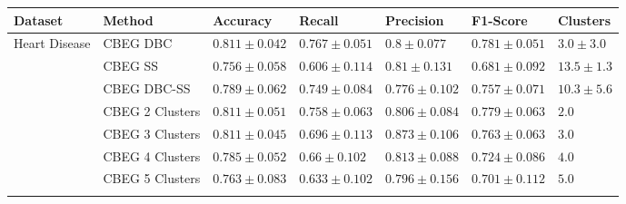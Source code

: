 \documentclass[12pt,a4paper]{standalone}
\begin{document}
\begin{tabular}{lllllll}
    \toprule
    \textbf{Dataset}                & \textbf{Method}   & \textbf{Accuracy}                             & \textbf{Recall}                               & \textbf{Precision}                            & \textbf{F1-Score}                             & \textbf{Clusters} \\ \midrule
    \multirow{11}{*}{Heart Disease} & CBEG DBC          & \cellcolor{gray!50}$0.811 \pm 0.042$          & \cellcolor{gray!50}$\mathbf{0.767 \pm 0.051}$ & $0.8 \pm 0.077$                               & \cellcolor{gray!50}$0.781 \pm 0.051$          & $3.0 \pm 3.0$ \\ \nopagebreak
                                    & CBEG SS           & $0.756 \pm 0.058$                             & $0.606 \pm 0.114$                             & $0.81 \pm 0.131$                              & $0.681 \pm 0.092$                             & $13.5 \pm 1.3$ \\ \nopagebreak
                                    & CBEG DBC-SS       & $0.789 \pm 0.062$                             & $0.749 \pm 0.084$                             & $0.776 \pm 0.102$                             & $0.757 \pm 0.071$                             & $10.3 \pm 5.6$ \\ \nopagebreak
                                    & CBEG 2 Clusters   & \cellcolor{gray!50}$0.811 \pm 0.051$          & $0.758 \pm 0.063$                             & $0.806 \pm 0.084$                             & $0.779 \pm 0.063$                             & $2.0$ \\ \nopagebreak
                                    & CBEG 3 Clusters   & \cellcolor{gray!50}$0.811 \pm 0.045$          & $0.696 \pm 0.113$                             & \cellcolor{gray!50}$\mathbf{0.873 \pm 0.106}$ & $0.763 \pm 0.063$                             & $3.0$ \\ \nopagebreak
                                    & CBEG 4 Clusters   & $0.785 \pm 0.052$                             & $0.66 \pm 0.102$                              & $0.813 \pm 0.088$                             & $0.724 \pm 0.086$                             & $4.0$ \\ \nopagebreak
                                    & CBEG 5 Clusters   & $0.763 \pm 0.083$                             & $0.633 \pm 0.102$                             & $0.796 \pm 0.156$                             & $0.701 \pm 0.112$                             & $5.0$ \\ \cmidrule{2-7}

\end{tabular}
\end{document}
